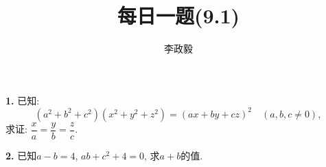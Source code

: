 \documentclass{article}
\title{每日一题(9.1)}
\author{\kaishu 李政毅}
\begin{document}
\maketitle
\textbf{1. }已知:
\[\left(a^2+b^2+c^2\right)\left(x^2+y^2+z^2\right)=(ax+by+cz)^2\quad(a,b,c\neq0),\]
求证: $\dfrac{x}{a}=\dfrac{y}{b}=\dfrac{z}{c}$.\\\par

\textbf{2. }已知$a-b=4$, $ab+c^2+4=0$, 求$a+b$的值.
\end{document}

